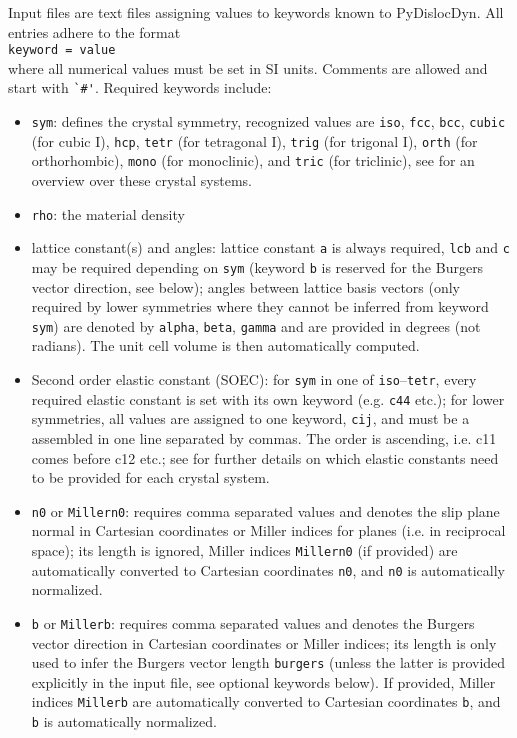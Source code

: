 \documentclass[11pt,letterpaper,oneside,pdftex]{article}
\begin{document}
Input files are text files assigning values to keywords known to PyDislocDyn.
All entries adhere to the format
\\\verb|keyword = value|\\
where all numerical values must be set in SI units.
Comments are allowed and start with \verb|`#'|.
Required keywords include:
\begin{itemize}
\item \verb|sym|: defines the crystal symmetry, recognized values are \verb|iso|, \verb|fcc|, \verb|bcc|, \verb|cubic| (for cubic I), \verb|hcp|, \verb|tetr| (for tetragonal I), \verb|trig| (for trigonal I), \verb|orth| (for orthorhombic), \verb|mono| (for monoclinic), and \verb|tric| (for triclinic), see \cite{Brugger:1965} for an overview over these crystal systems.

\item \verb|rho|: the material density

\item lattice constant(s) and angles: lattice constant \verb|a| is always required, \verb|lcb| and \verb|c| may be required depending on \verb|sym| (keyword \verb|b| is reserved for the Burgers vector direction, see below); angles between lattice basis vectors (only required by lower symmetries where they cannot be inferred from keyword \verb|sym|) are denoted by \verb|alpha|, \verb|beta|, \verb|gamma| and are provided in degrees (not radians).
The unit cell volume is then automatically computed.

\item Second order elastic constant (SOEC): for \verb|sym| in one of \verb|iso|--\verb|tetr|, every required elastic constant is set with its own keyword (e.g. \verb|c44| etc.);
for lower symmetries, all values are assigned to one keyword, \verb|cij|, and must be a assembled in one line separated by commas.
The order is ascending, i.e. c11 comes before c12 etc.; see \cite{Brugger:1965} for further details on which elastic constants need to be provided for each crystal system.

\item \verb|n0| or \verb|Millern0|: requires comma separated values and denotes the slip plane normal in Cartesian coordinates or Miller indices for planes (i.e. in reciprocal space); its length is ignored, Miller indices \verb|Millern0| (if provided) are automatically converted to Cartesian coordinates \verb|n0|, and \verb|n0| is automatically normalized.

\item \verb|b| or \verb|Millerb|: requires comma separated values and denotes the Burgers vector direction in Cartesian coordinates or Miller indices; its length is only used to infer the Burgers vector length \verb|burgers| (unless the latter is provided explicitly in the input file, see optional keywords below).
If provided, Miller indices \verb|Millerb| are automatically converted to Cartesian coordinates \verb|b|, and \verb|b| is automatically normalized.
\end{itemize}
\end{document}
